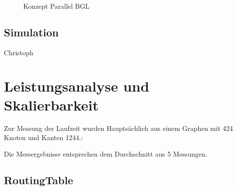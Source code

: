 \documentclass[paper=A4,pagesize=auto,12pt,headinclude=true,footinclude=true,BCOR=0mm,DIV=calc]{scrartcl}
\begin{document}
	\label{boost}
	\begin{figure}[H]
		\caption{Konzept Parallel BGL}
		\cite{ParallelBGLPicture}
	\end{figure}
	
	
	\subsection{Simulation}
		
		Christoph
	
	\section{Leistungsanalyse und Skalierbarkeit}
	Zur Messung der Laufzeit wurden Hauptsächlich aus einem Graphen mit 424 Knoten und Kanten 1244.:
	
	
	Die Messergebnisse entsprechen dem Durchschnitt aus 5 Messungen.
	\subsection{RoutingTable}
\end{document}
